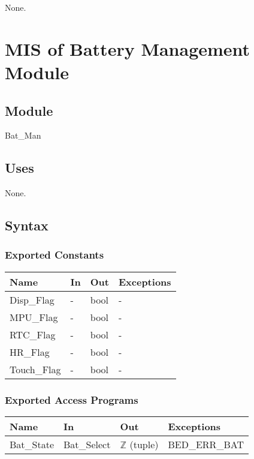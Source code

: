 \documentclass[12pt, titlepage]{article}
\begin{document}
None.

\newpage


\section{MIS of Battery Management Module} \label{mBM} 

\subsection{Module}

Bat\_Man

\subsection{Uses}

None.

\subsection{Syntax}

\subsubsection{Exported Constants}

\begin{center}
\begin{tabular}{p{2cm} p{4cm} p{4cm} p{2cm}}
\hline
\textbf{Name} & \textbf{In} & \textbf{Out} & \textbf{Exceptions} \\
\hline
Disp\_Flag& - & bool & - \\
MPU\_Flag& - & bool & - \\
RTC\_Flag& - & bool & - \\
HR\_Flag& - & bool & - \\
Touch\_Flag& - & bool & - \\
\hline
\end{tabular}
\end{center}

\subsubsection{Exported Access Programs}

\begin{center}
\begin{tabular}{p{2cm} p{4cm} p{4cm} p{2cm}}
\hline
\textbf{Name} & \textbf{In} & \textbf{Out} & \textbf{Exceptions} \\
\hline
Bat\_State & Bat\_Select & $\mathbb{Z}$ (tuple) & BED\_ERR\_BAT\\
\hline
\end{tabular}
\end{center}
\end{document}
